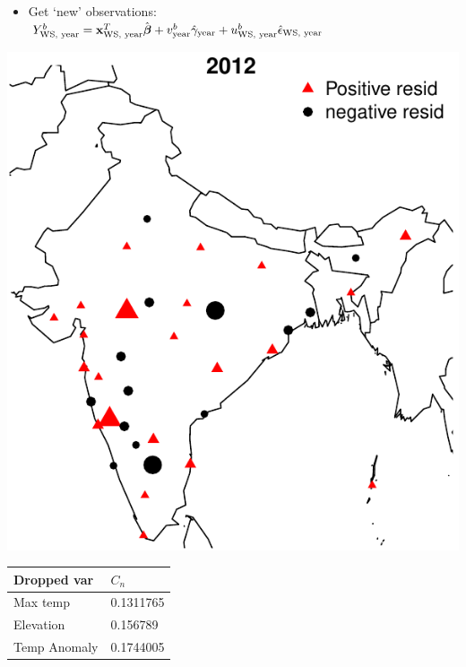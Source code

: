 \documentclass[landscape,a0paper,fontscale=0.3]{baposter} %
\makeatletter
\def\zapcolorreset{\let\reset@color\relax\ignorespaces}
\def\colorrows#1{\noalign{\aftergroup\zapcolorreset#1}\ignorespaces}
\makeatother
\begin{document}
\begin{poster}
{\begin{minipage}[b]{.7\textwidth}
{{\begin{itemize}[leftmargin=*]
\item Get `new' observations: $ Y^b_\text{WS, year} = {\bf{x}}^T_\text{WS, year} \hat{{\boldsymbol{\beta}}} + v^b_\text{year} \hat \gamma_\text{year} + u^b_\text{WS, year} \hat\epsilon_\text{WS, year} $
\end{itemize}
\vspace{-1em}
}}

\vspace{2em}
\parbox{.69\textwidth}{
\vspace{-1em}
\begin{center}
\includegraphics[width=1\linewidth]{rolling_map2012_full_vs_reduced_cropped}
\end{center}
}
%
\parbox{.3\textwidth}{
\vspace{-1em}
\fontsize{6}{7.2}
\selectfont
\begin{tabular}{ll}
\hline
    \textbf{Dropped var}    & \textbf{$C_n$}        \\\hline
    \colorrows{\color{blue}}
    Max temp              & 0.1311765 \\
    Elevation             & 0.156789  \\
    Temp Anomaly          & 0.1744005 \\

\end{tabular}}
\end{minipage}}
\end{poster}
\end{document}
